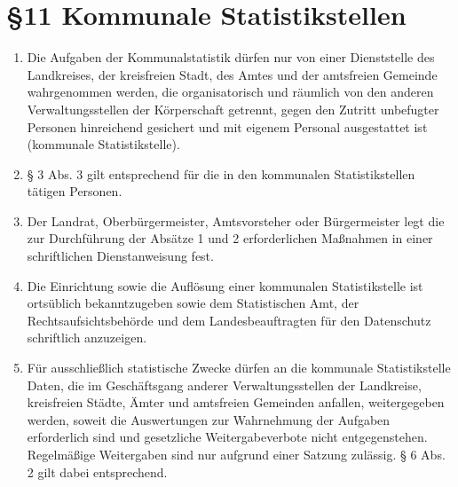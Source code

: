     \section{\S11 Kommunale Statistikstellen}
    \begin{enumerate}[label=(\arabic*)]
        \item Die Aufgaben der Kommunalstatistik dürfen nur von einer Dienststelle des Landkreises, der kreisfreien Stadt, des Amtes und der amtsfreien Gemeinde wahrgenommen werden, die organisatorisch und räumlich von den anderen Verwaltungsstellen der Körperschaft getrennt, gegen den Zutritt unbefugter Personen hinreichend gesichert und mit eigenem Personal ausgestattet ist (kommunale Statistikstelle).
        \item § 3 Abs. 3 gilt entsprechend für die in den kommunalen Statistikstellen tätigen Personen.
        \item Der Landrat, Oberbürgermeister, Amtsvorsteher oder Bürgermeister legt die zur Durchführung der Absätze 1 und 2 erforderlichen Maßnahmen in einer schriftlichen Dienstanweisung fest.
        \item Die Einrichtung sowie die Auflösung einer kommunalen Statistikstelle ist ortsüblich bekanntzugeben sowie dem Statistischen Amt, der Rechtsaufsichtsbehörde und dem Landesbeauftragten für den Datenschutz schriftlich anzuzeigen.
        \item Für ausschließlich statistische Zwecke dürfen an die kommunale Statistikstelle Daten, die im Geschäftsgang anderer Verwaltungsstellen der Landkreise, kreisfreien Städte, Ämter und amtsfreien Gemeinden anfallen, weitergegeben werden, soweit die Auswertungen zur Wahrnehmung der Aufgaben erforderlich sind und gesetzliche Weitergabeverbote nicht entgegenstehen. Regelmäßige Weitergaben sind nur aufgrund einer Satzung zulässig. § 6 Abs. 2 gilt dabei entsprechend.

    \end{enumerate}

